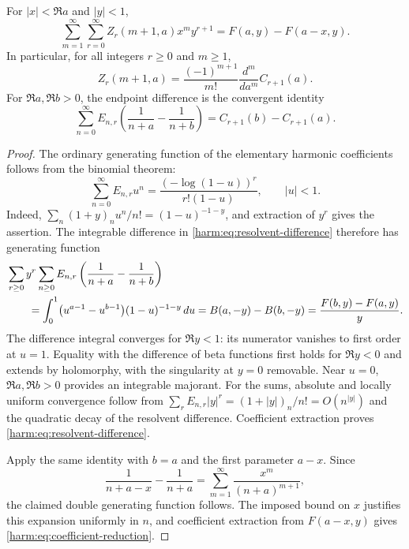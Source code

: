 \begin{theorem}
\label{harm:thm:gamma-generating}
For $|x|<\Re a$ and $|y|<1$,
\begin{equation}\label{harm:eq:double-generator}
 \sum_{m=1}^{\infty}\sum_{r=0}^{\infty}
 Z_r(m+1,a)x^m y^{r+1}
 =F(a,y)-F(a-x,y).
\end{equation}
In particular, for all integers $r\ge0$ and $m\ge1$,
\begin{equation}\label{harm:eq:coefficient-reduction}
 \boxed{\displaystyle
 Z_r(m+1,a)=\frac{(-1)^{m+1}}{m!}
                 \frac{d^m}{da^m}C_{r+1}(a).}
\end{equation}
For $\Re a,\Re b>0$, the endpoint difference is the convergent identity
\begin{equation}\label{harm:eq:resolvent-difference}
 \boxed{\displaystyle
 \sum_{n=0}^{\infty}E_{n,r}
 \left(\frac1{n+a}-\frac1{n+b}\right)
 =C_{r+1}(b)-C_{r+1}(a).}
\end{equation}
\end{theorem}

\begin{proof}
The ordinary generating function of the elementary harmonic coefficients
follows from the binomial theorem:
\begin{equation}\label{harm:eq:ordinary-generator}
 \sum_{n=0}^{\infty} E_{n,r}u^n
 =\frac{(-\log(1-u))^r}{r!(1-u)},\qquad |u|<1.
\end{equation}
Indeed,
$\sum_n(1+y)_n u^n/n!=(1-u)^{-1-y}$, and extraction of $y^r$
gives the assertion.  The integrable difference in
\eqref{harm:eq:resolvent-difference} therefore has generating function
\begin{align}
 &\sum_{r\ge0}y^r\sum_{n\ge0}E_{n,r}
       \left(\frac1{n+a}-\frac1{n+b}\right)\notag\\
 &\qquad=\int_0^1
       \bigl(u^{a-1}-u^{b-1}\bigr)(1-u)^{-1-y}\,du
       =B(a,-y)-B(b,-y)
       =\frac{F(b,y)-F(a,y)}y.
 \label{harm:eq:beta-difference}
\end{align}
The difference integral converges for $\Re y<1$: its numerator vanishes
to first order at $u=1$.  Equality with the difference of beta functions
first holds for $\Re y<0$ and extends by holomorphy, with the singularity
at $y=0$ removable.  Near $u=0$, $\Re a,\Re b>0$ provides an integrable
majorant.  For the sums, absolute and locally uniform convergence follow
from $\sum_r E_{n,r}|y|^r=(1+|y|)_n/n!=O(n^{|y|})$ and the quadratic
decay of the resolvent difference.  Coefficient extraction proves
\eqref{harm:eq:resolvent-difference}.

Apply the same identity with $b=a$ and the first parameter $a-x$.
Since
\[
 \frac1{n+a-x}-\frac1{n+a}
 =\sum_{m=1}^{\infty}\frac{x^m}{(n+a)^{m+1}},
\]
the claimed double generating function follows.  The imposed bound on
$x$ justifies this expansion uniformly in $n$, and coefficient extraction
from $F(a-x,y)$ gives \eqref{harm:eq:coefficient-reduction}.
\end{proof}

